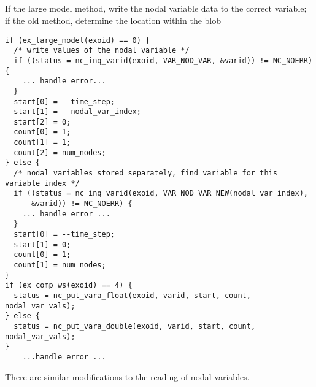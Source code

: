 \subsection{}
If the large model method, write the nodal variable data to the
correct variable; if the old method, determine the location within the
blob

\begin{lstlisting}
if (ex_large_model(exoid) == 0) {
  /* write values of the nodal variable */
  if ((status = nc_inq_varid(exoid, VAR_NOD_VAR, &varid)) != NC_NOERR) {
    ... handle error...
  }
  start[0] = --time_step;
  start[1] = --nodal_var_index;
  start[2] = 0;
  count[0] = 1;
  count[1] = 1;
  count[2] = num_nodes;
} else {
  /* nodal variables stored separately, find variable for this variable index */
  if ((status = nc_inq_varid(exoid, VAR_NOD_VAR_NEW(nodal_var_index), 
      &varid)) != NC_NOERR) {
    ... handle error ...
  }
  start[0] = --time_step;
  start[1] = 0;
  count[0] = 1;
  count[1] = num_nodes;
}
if (ex_comp_ws(exoid) == 4) {
  status = nc_put_vara_float(exoid, varid, start, count, nodal_var_vals);
} else {
  status = nc_put_vara_double(exoid, varid, start, count, nodal_var_vals);
}
    ...handle error ...
\end{lstlisting}
There are similar modifications to the reading of nodal variables.
